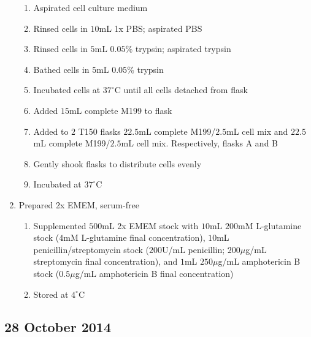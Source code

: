 \begin{enumerate}
		\begin{enumerate}
			\item Aspirated cell culture medium
			\item Rinsed cells in $10$mL 1x PBS; aspirated PBS
			\item Rinsed cells in $5$mL $0.05$\% trypsin; aspirated trypsin
			\item Bathed cells in $5$mL $0.05$\% trypsin
			\item Incubated cells at $37^{\circ}$C until all cells detached from flask
			\item Added $15$mL complete M199 to flask
			\item Added to $2$ T150 flasks $22.5$mL complete M199/$2.5$mL cell mix and $22.5$mL complete M199/$2.5$mL cell mix. Respectively, flasks A and B
			\item Gently shook flasks to distribute cells evenly
			\item Incubated at $37^{\circ}$C
		\end{enumerate}
	\item Prepared 2x EMEM, serum-free
		\begin{enumerate}
			\item Supplemented $500$mL 2x EMEM stock with $10$mL $200$mM L-glutamine stock ($4$mM L-glutamine final concentration), $10$mL penicillin/streptomycin stock ($200$U/mL penicillin; $200\mu$g/mL streptomycin final concentration), and $1$mL $250\mu$g/mL amphotericin B stock ($0.5\mu$g/mL amphotericin B final concentration)
			\item Stored at $4^{\circ}$C
		\end{enumerate}
\end{enumerate}

\subsection*{28 October 2014}

